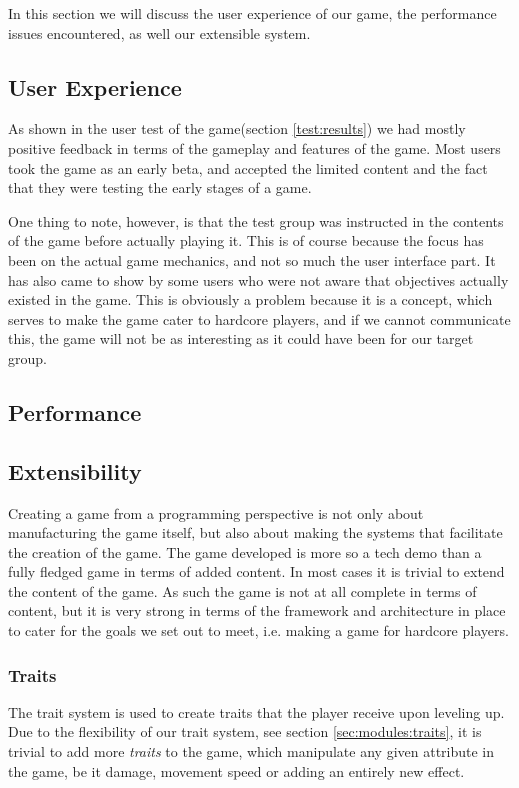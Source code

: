 In this section we will discuss the user experience of our game, the performance issues encountered, as well our extensible system.

\subsection{User Experience}
As shown in the user test of the game(section \ref{test:results}) we had mostly positive feedback in terms of the gameplay and features of the game.
Most users took the game as an early beta, and accepted the limited content and the fact that they were testing the early stages of a game.

One thing to note, however, is that the test group was instructed in the contents of the game before actually playing it. 
This is of course because the focus has been on the actual game mechanics, and not so much the user interface part.
It has also came to show by some users who were not aware that objectives actually existed in the game.
This is obviously a problem because it is a concept, which serves to make the game cater to hardcore players, and if we cannot communicate this, the game will not be as interesting as it could have been for our target group.

\subsection{Performance}

\subsection{Extensibility}
Creating a game from a programming perspective is not only about manufacturing the game itself, but also about making the systems that facilitate the creation of the game.
The game developed is more so a tech demo than a fully fledged game in terms of added content.
In most cases it is trivial to extend the content of the game. 
As such the game is not at all complete in terms of content, but it is very strong in terms of the framework and architecture in place to cater for the goals we set out to meet, i.e. making a game for hardcore players.

\subsubsection{Traits}\label{dicsussion:traits}
The trait system is used to create traits that the player receive upon leveling up.
Due to the flexibility of our trait system, see section \ref{sec:modules:traits}, it is trivial to add more \emph{traits} to the game, which manipulate any given attribute in the game, be it damage, movement speed or adding an entirely new effect. 

